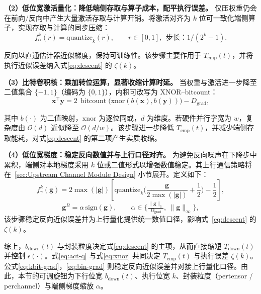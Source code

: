 \textbf{（2）低位宽激活量化：降低端侧存取与算子成本，配平执行误差。}
仅压权重仍会在前向/反向中产生大量激活存取与计算开销。将激活对齐为 $k$ 位可一致化端侧算子，实现存取与计算的同步压缩：
\begin{equation}
	\label{eq:act-q}
	f_{\alpha}^{k}(r)=\mathrm{quantize}_{k}(r),\qquad r\in[0,1],\ \ \text{步长：}1/(2^{k}-1).
\end{equation}

反向以直通估计器近似梯度，保持可训练性。该步骤主要作用于 $T_{\mathrm{cmp}}(t)$，并将执行近似误差纳入式\eqref{eq:descent} 的 $\zeta(k)$。


\textbf{（3）比特卷积核：乘加转位运算，显著收缩计算时延。}
当权重与激活进一步降至二值集合 $\{-1,1\}$（编码为 $\{0,1\}$），内积可改写为 XNOR–bitcount：
\begin{equation}
	\label{eq:xnor}
	\mathbf{x}^\top \mathbf{y}
	=
	2\,\operatorname{bitcount}\!\big(\mathrm{xnor}(b(\mathbf{x}), b(\mathbf{y}))\big)
	- D_{\text{grad}},
\end{equation}

其中 $b(\cdot)$ 为二值映射，$\mathrm{xnor}$ 为逐位同或，$d$ 为维度。若硬件并行字宽为 $w$，复杂度由 $\mathcal O(d)$ 近似降至 $\mathcal O(d/w)$。该步骤进一步降低 $T_{\mathrm{cmp}}(t)$，并减少端侧存取能耗，对式\eqref{eq:descent} 的第二项产生实质收缩。

\textbf{（4）低位宽梯度：稳定反向数值并与上行口径对齐。}
为避免反向噪声在下降步中累积，端侧对本地梯度采用 $k$ 位或二值形式以增强数值稳定。其上行通信策略将在~\ref{sec:Upstream Channel Module Design} 小节展开。定义如下：
\begin{equation}
	f_{\gamma}^{k}(\mathbf{g})
	=
	2 \max(|\mathbf{g}|)
	\left[
	\mathrm{quantize}_{k}\!\Big(
	\frac{\mathbf{g}}{2\max(|\mathbf{g}|)} + \frac{1}{2}
	\Big)
	- \frac{1}{2}
	\right],
\end{equation}\label{eq:kbit-grad}
\begin{equation}
	\mathbf{g}^{B}
	= \alpha\,\mathrm{sign}(\mathbf{g}),\qquad
	\alpha \in \Big\{ \tfrac{\|\mathbf{g}\|_1}{D_{\text{grad}}},\ \|\mathbf{g}\|_\infty \Big\},
\end{equation}\label{eq:bin-grad}
该步骤稳定反向近似误差并为上行量化提供统一数值口径，影响式~\eqref{eq:descent} 的 $\zeta(k)$。

综上，$b_{\text{down}}(t)$ 与封装粒度决定式\eqref{eq:descent} 的主项，从而直接缩短 $T_{\text{down}}(t)$ 并控制 $\epsilon(\cdot)$。式\eqref{eq:act-q} 与式\eqref{eq:xnor} 共同决定 $T_{\mathrm{cmp}}(t)$ 与执行误差 $\zeta(k)$。公式\eqref{eq:kbit-grad}，\eqref{eq:bin-grad} 则稳定反向近似误差并对接上行量化口径。由此，本节的可调旋钮为下行位宽 $b_{\text{down}}(t)$、执行位宽 $k$、封装粒度（per\text{-}tensor / per\text{-}channel）与端侧梯度缩放 $\alpha$。

